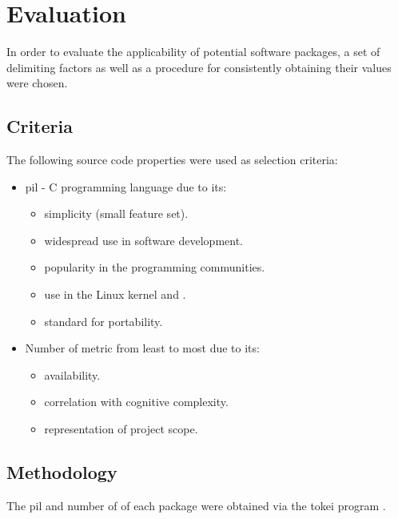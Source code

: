 \section{Evaluation}\label{Evaluation}

In order to evaluate the applicability of potential software packages, a set of delimiting factors as well as a procedure for consistently obtaining their values were chosen.

\subsection{Criteria}

The following source code properties were used as selection criteria:

\begin{itemize}
    \item \gls{pil} - C programming language due to its:
    \begin{itemize}
        \item simplicity (small feature set).
        \item widespread use in software development.
        \item popularity in the programming communities.
        \item use in the Linux kernel and .
        \item standard for  portability.
    \end{itemize}
    \item Number of  metric from least to most due to its:
    \begin{itemize}
        \item availability.
        \item correlation with cognitive complexity.
        \item representation of project scope.
    \end{itemize}
\end{itemize}

\subsection{Methodology}

The \gls{pil} and number of  of each package were obtained via the tokei program \cite{tokei}.
